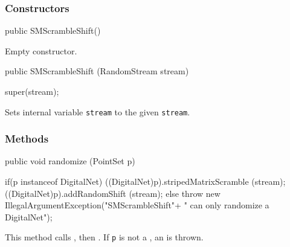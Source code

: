 \subsubsection*{Constructors}
\begin{code}

   public SMScrambleShift() \begin{hide} {
   }
   \end{hide}
\end{code}
\begin{tabb}
   Empty constructor.
\end{tabb}
\begin{code}

   public SMScrambleShift (RandomStream stream) \begin{hide} {
       super(stream);
   }
   \end{hide}
\end{code}
\begin{tabb}
   Sets internal variable \texttt{stream} to the given
   \texttt{stream}.
\end{tabb}
\begin{htmlonly}
\end{htmlonly}

\subsubsection*{Methods}

\begin{code}

   public void randomize (PointSet p) \begin{hide} {
      if(p instanceof DigitalNet){
         ((DigitalNet)p).stripedMatrixScramble (stream);
         ((DigitalNet)p).addRandomShift (stream);
      }else{
         throw new IllegalArgumentException("SMScrambleShift"+
                                            " can only randomize a DigitalNet");
      }
   }
   \end{hide}
\end{code}
\begin{tabb}
   This method calls
   ,
   then
   .
   If \texttt{p} is not a
   , an
 is thrown.
\end{tabb}
\begin{htmlonly}
\end{htmlonly}
\begin{code}\begin{hide}
}
\end{hide}\end{code}

